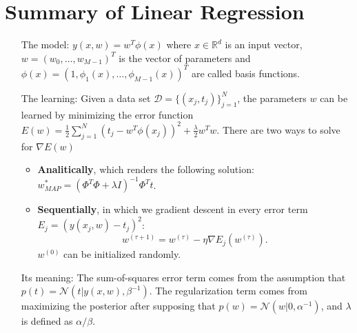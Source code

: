 \section{Summary of Linear Regression}

\begin{itemize}
	\item[The model:] $y(x,w) = w^{T}\phi(x)$ where $x\in\mathbb{R}^d$ is an input vector, $w = (w_0,\dots,w_{M-1})^T$ is the vector of parameters and $\phi(x) = (1, \phi_1(x), \dots, \phi_{M-1}(x))^T$ are called basis functions.

	\item[The learning:] Given a data set $\mathcal{D} = \{(x_j,t_j)\}_{j=1}^N$, the parameters $w$ can be learned by minimizing the error function $E(w) = \frac{1}{2}\sum_{j=1}^N(t_j - w^T\phi(x_j))^2 + \frac{\lambda}{2}w^Tw$. There are two ways to solve for $\nabla E(w)$
	\begin{itemize}
		\item \textbf{Analitically}, which renders the following solution: $w^*_{MAP} = (\Phi^T\Phi + \lambda I)^{-1}\Phi^Tt$.
		\item \textbf{Sequentially}, in which we gradient descent in every error term 
		$E_j = (y(x_j,w) - t_j)^2$: \[w^{(\tau + 1)} = w^{(\tau)} - \eta\nabla E_j(w^{(\tau)}).\] $w^{(0)}$ can be initialized randomly.
	\end{itemize}

	\item[Its meaning:] The sum-of-squares error term comes from the assumption that $p(t) = \mathcal{N}(t|y(x,w), \beta^{-1})$. The regularization term comes from maximizing the posterior after supposing that $p(w) = \mathcal{N}(w|0, \alpha^{-1})$, and $\lambda$ is defined as $\alpha/\beta$.
\end{itemize}
